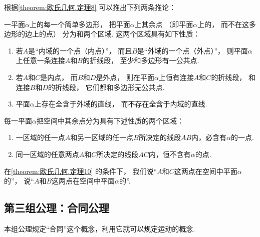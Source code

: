 根据\cref{theorem:欧氏几何.定理8} 可以推出下列两条推论：
\begin{theorem}\label{theorem:欧氏几何.定理9}
一平面\(\alpha\)上的每一个简单多边形，
把平面\(\alpha\)上其余点%
（即平面\(\alpha\)上的，
而不在这多边形的边上的点）%
分为和两个区域.
这两个区域具有如下性质：
\begin{enumerate}
	\item 若\(A\)是“内域的一个点（内点）”，
	而且\(B\)是“外域的一个点（外点）”，
	则平面\(\alpha\)上任意一条连接\(A\)和\(B\)的折线段，
	至少和多边形有一公共点.

	\item 若\(A\)和\(C\)是内点，
	而\(B\)和\(D\)是外点，
	则在平面\(\alpha\)上恒有连接\(A\)和\(C\)的折线段，
	和连接\(B\)和\(D\)的折线段，
	它们都和多边形无公共点.

	\item 平面\(\alpha\)上存在全含于外域的直线，
	而不存在全含于内域的直线.
\end{enumerate}
\end{theorem}

\begin{theorem}\label{theorem:欧氏几何.定理10}
每一平面\(\alpha\)把空间中其余点分为具有下述性质的两个区域：
\begin{enumerate}
	\item 一区域的任一点\(A\)和另一区域的任一点\(B\)所决定的线段\(AB\)内，必含有\(\alpha\)的一点.
	\item 同一区域的任意两点\(A\)和\(C\)所决定的线段\(AC\)内，恒不含有\(\alpha\)的点.
\end{enumerate}
\end{theorem}

\begin{definition}
在\cref{theorem:欧氏几何.定理10} 的条件下，
我们说“\(A\)和\(C\)这两点在空间中平面\(\alpha\)的”，
说“\(A\)和\(B\)这两点在空间中平面\(\alpha\)的”.
\end{definition}

\subsection{第三组公理：合同公理}
本组公理规定“合同”这个概念，利用它就可以规定运动的概念.


